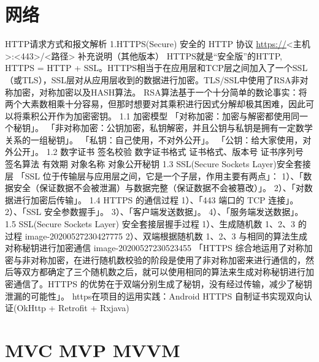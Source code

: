 \documentclass[9pt, b5paper]{article}
\begin{document}
\section{网络}
\label{sec-17}
HTTP请求方式和报文解析
1.HTTPS(Secure) 安全的 HTTP 协议
\url{https://}<主机>:<443>/<路径>
补充说明（其他版本）
HTTPS就是“安全版”的HTTP, HTTPS = HTTP + SSL。HTTPS相当于在应用层和TCP层之间加入了一个SSL（或TLS），SSL层对从应用层收到的数据进行加密。TLS/SSL中使用了RSA非对称加密，对称加密以及HASH算法。
RSA算法基于一个十分简单的数论事实：将两个大素数相乘十分容易，但那时想要对其乘积进行因式分解却极其困难，因此可以将乘积公开作为加密密钥。
1.1 加密模型
「对称加密：加密与解密都使用同一个秘钥」。
「非对称加密：公钥加密，私钥解密，并且公钥与私钥是拥有一定数学关系的一组秘钥」。
「私钥：自己使用，不对外公开」。
「公钥：给大家使用，对外公开」。
1.2 数字证书 签名校验
数字证书格式
证书格式、版本号
证书序列号
签名算法
有效期
对象名称
对象公开秘钥
1.3 SSL(Secure Sockets Layer)安全套接层
「SSL 位于传输层与应用层之间，它是一个子层，作用主要有两点」：
1）、「数据安全（保证数据不会被泄漏）与数据完整（保证数据不会被篡改）」。
2）、「对数据进行加密后传输」。
1.4 HTTPS 的通信过程
1）、「443 端口的 TCP 连接」。
2）、「SSL 安全参数握手」。
3）、「客户端发送数据」。
4）、「服务端发送数据」。
1.5 SSL(Secure Sockets Layer) 安全套接层握手过程
1）、生成随机数 1、2、3 的过程
image-20200527230427775
2）、双端根据随机数 1、2、3 与相同的算法生成对称秘钥进行加密通信
image-20200527230523455
「HTTPS 综合地运用了对称加密与非对称加密，在进行随机数校验的阶段是使用了非对称加密来进行通信的，然后等双方都确定了三个随机数之后，就可以使用相同的算法来生成对称秘钥进行加密通信了。HTTPS 的优势在于双端分别生成了秘钥，没有经过传输，减少了秘钥泄漏的可能性」。
https在项目的运用实践：Android HTTPS 自制证书实现双向认证(OkHttp + Retrofit + Rxjava)

\section{MVC MVP MVVM}
\label{sec-18}
\end{document}
